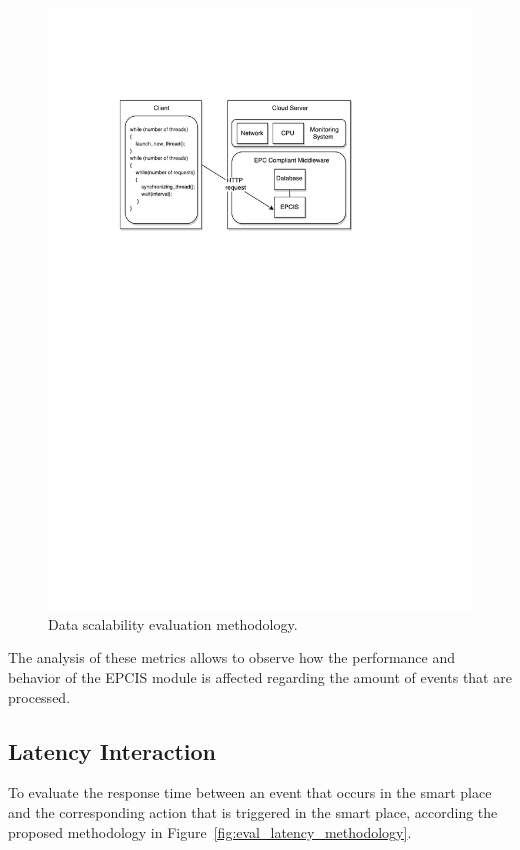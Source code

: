 \begin{figure}[ht!]
  \centering
  \includegraphics[width=.7\textwidth]{./images/eval_data_methodology}
  \caption{Data scalability evaluation methodology.}
  \label{fig:eval_data_methodology}
\end{figure}

The analysis of these metrics allows to observe how the performance and behavior of the \gls{EPCIS}
module is affected regarding the amount of events that are processed.

\subsection{Latency Interaction}
\label{sub:eval_methodology_latency}
To evaluate the response time between an event that occurs in the smart place and the corresponding
action that is triggered in the smart place, according the proposed methodology in Figure~\ref{fig:eval_latency_methodology}.\\

